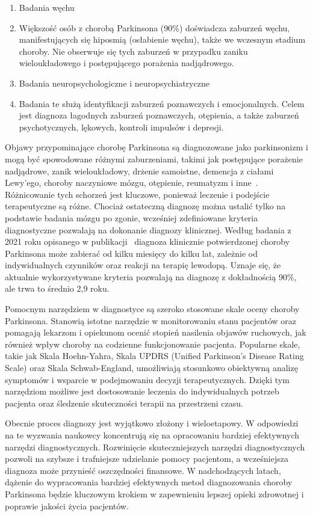 \begin{enumerate}
	\item Badania węchu
	\item[] Większość osób z chorobą Parkinsona (90\%) doświadcza zaburzeń węchu, manifestujących się hiposmią (osłabienie węchu), także we wczesnym stadium choroby.
Nie obserwuje się tych zaburzeń w przypadku zaniku wieloukładowego i postępującego porażenia nadjądrowego.

	\item Badania neuropsychologiczne i neuropsychiatryczne
	\item[] Badania te służą identyfikacji zaburzeń poznawczych i emocjonalnych.
Celem jest diagnoza łagodnych zaburzeń poznawczych, otępienia, a także zaburzeń psychotycznych, lękowych, kontroli impulsów i depresji.
\end{enumerate}

Objawy przypominające chorobę Parkinsona są diagnozowane jako parkinsonizm i mogą być spowodowane różnymi zaburzeniami, takimi jak postępujące porażenie nadjądrowe, zanik wieloukładowy,
drżenie samoistne, demencja z ciałami Lewy'ego, choroby naczyniowe mózgu, otępienie, reumatyzm i inne~\cite{diagnostyka_Sitek}.
Różnicowanie tych schorzeń jest kluczowe, ponieważ leczenie i podejście terapeutyczne są różne.
Chociaż ostateczną diagnozę można ustalić tylko na podstawie badania mózgu po zgonie, wcześniej zdefiniowane kryteria diagnostyczne pozwalają na dokonanie diagnozy klinicznej.
Według badania z 2021 roku opisanego w publikacji~\cite{ROSSI202153} diagnoza klinicznie potwierdzonej choroby Parkinsona może zabierać od kilku miesięcy do kilku lat, zależnie od indywidualnych czynników oraz reakcji na terapię lewodopą.
Uznaje się, że aktualnie wykorzystywane kryteria pozwalają na diagnozę z dokładnością 90\%, ale trwa to średnio 2,9 roku.

Pomocnym narzędziem w diagnostyce są szeroko stosowane skale oceny choroby Parkinsona.
Stanowią istotne narzędzie w monitorowaniu stanu pacjentów oraz pomagają lekarzom i opiekunom ocenić stopień nasilenia objawów ruchowych,
jak również wpływ choroby na codzienne funkcjonowanie pacjenta.
Popularne skale, takie jak Skala Hoehn-Yahra, Skala UPDRS (Unified Parkinson's Disease Rating Scale) oraz Skala Schwab-England,
umożliwiają stosunkowo obiektywną analizę symptomów i wsparcie w podejmowaniu decyzji terapeutycznych.
Dzięki tym narzędziom możliwe jest dostosowanie leczenia do indywidualnych potrzeb pacjenta oraz śledzenie skuteczności terapii na przestrzeni czasu.

Obecnie proces diagnozy jest wyjątkowo złożony i wieloetapowy.
W odpowiedzi na te wyzwania naukowcy koncentrują się na opracowaniu bardziej efektywnych narzędzi diagnostycznych.
Rozwinięcie skuteczniejszych narzędzi diagnostycznych pozwoli na szybsze i trafniejsze udzielanie pomocy pacjentom, a wcześniejsza diagnoza może przynieść oszczędności finansowe.
W nadchodzących latach, dążenie do wypracowania bardziej efektywnych metod diagnozowania choroby Parkinsona będzie kluczowym krokiem w zapewnieniu lepszej opieki zdrowotnej i poprawie jakości życia pacjentów.

